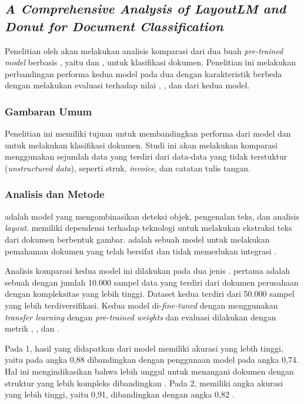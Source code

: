 \subsection{\textit{A Comprehensive Analysis of LayoutLM and Donut for Document Classification}}
\label{sec:penelitian-1}
Penelitian oleh \cite{bajrami2023comprehensive}  akan melakukan analisis komparasi dari dua buah \textit{pre-trained model} berbasis \transformer{}, yaitu \layoutlm{} dan \donut, untuk klasifikasi dokumen. Penelitian ini melakukan perbandingan performa kedua model pada dua \dataset{} dengan karakteristik berbeda dengan melakukan evaluasi 
terhadap nilai \accuracy, \precision, dan \fscore{} dari kedua model. 

\subsubsection{Gambaran Umum}
Penelitian ini memiliki tujuan untuk membandingkan performa dari model \donut{} dan \layoutlm{} untuk melakukan klasifikasi dokumen. Studi ini akan 
melakukan komparasi menggunakan sejumlah data yang terdiri dari data-data yang tidak terstuktur (\textit{unstructured data}), seperti struk, \textit{invoice}, dan catatan tulis tangan.

\subsubsection{Analisis dan Metode}
\layoutlm{} adalah model yang mengombinasikan deteksi objek, pengenalan teks, dan analisis \textit{layout}. \layoutlm{} memiliki dependensi terhadap teknologi \ocr{} untuk melakukan ekstraksi teks dari dokumen berbentuk gambar. \donut{} adalah sebuah model \transformer{} untuk melakukan 
pemahaman dokumen yang telah bersifat \sotafull{} dan tidak memerlukan integrasi \ocr.

Analisis komparasi kedua model ini dilakukan pada dua jenis \dataset. \datasetfl{} pertama adalah sebuah \dataset{} dengan jumlah 10.000 sampel data yang terdiri dari dokumen perusahaan dengan kompleksitas yang lebih tinggi. Dataset 
kedua terdiri dari 50.000 sampel yang lebih terdiversifikasi. Kedua model di-\textit{fine-tuned} dengan menggunakan \textit{transfer learning} dengan \textit{pre-trained weights} dan evaluasi dilakukan dengan metrik \accuracy, \precision, dan \fscore.  

Pada \dataset{} 1, hasil yang didapatkan dari model \layoutlm{} memiliki akurasi yang lebih tinggi, yaitu pada angka 0,88 dibandingkan dengan penggunaan model \donut{} pada angka 0,74. Hal ini mengindikasikan bahwa \layoutlm{} lebih unggul untuk menangani dokumen dengan struktur yang lebih kompleks dibandingkan \donut{}. Pada \dataset{} 2, \donut{} memiliki angka akurasi yang lebih tinggi, yaitu 0,91, dibandingkan \layoutlm{} dengan angka 0,82 \parencite{bajrami2023comprehensive}.

